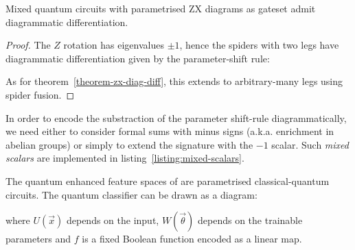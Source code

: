 \begin{corollary}
Mixed quantum circuits with parametrised ZX diagrams as gateset admit diagrammatic differentiation.
\end{corollary}

\begin{proof}
The $Z$ rotation has eigenvalues $\pm 1$, hence the spiders with two legs have
diagrammatic differentiation given by the parameter-shift rule:


As for theorem~\ref{theorem-zx-diag-diff}, this extends to
arbitrary-many legs using spider fusion.
\end{proof}

\begin{remark}
In order to encode the substraction of the parameter shift-rule diagrammatically, we
need either to consider formal sums with minus signs (a.k.a. enrichment in
abelian groups) or simply to extend the signature with the $-1$ scalar.
Such \emph{mixed scalars} are implemented in listing~\ref{listing:mixed-scalars}.
\end{remark}

\begin{example}
The quantum enhanced feature spaces of \cite{HavlicekEtAl19} are parametrised
classical-quantum circuits.
The quantum classifier can be drawn as a diagram:


where $U(\vec{x})$ depends on the input, $W(\vec{\theta})$ depends on the
trainable parameters and $f$ is a fixed Boolean function encoded as a linear map.
\end{example}
